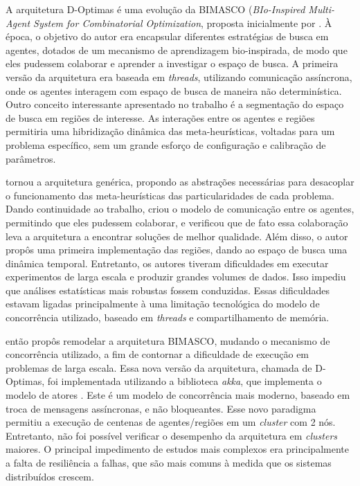 A arquitetura D-Optimas é uma evolução da BIMASCO (\textit{BIo-Inspired Multi-Agent System for Combinatorial Optimization}, proposta inicialmente por . À época, o objetivo do autor era encapsular diferentes estratégias de busca em agentes, dotados de um mecanismo de aprendizagem bio-inspirada, de modo que eles pudessem colaborar e aprender a investigar o espaço de busca. A primeira versão da arquitetura era baseada em \textit{threads}, utilizando comunicação assíncrona, onde os agentes interagem com espaço de busca de maneira não determinística. Outro conceito interessante apresentado no trabalho é a segmentação do espaço de busca em regiões de interesse. 
As interações entre os agentes e regiões permitiria uma hibridização dinâmica das meta-heurísticas, voltadas para um problema específico, sem um grande esforço de configuração e calibração de parâmetros.

 tornou a arquitetura genérica, propondo as abstrações necessárias para desacoplar o funcionamento das meta-heurísticas das particularidades de cada problema. Dando continuidade ao trabalho,  criou o modelo de comunicação entre os agentes, permitindo que eles pudessem colaborar, e verificou que de fato essa colaboração leva a arquitetura a encontrar soluções de melhor qualidade. Além disso, o autor propôs uma primeira implementação das regiões, dando ao espaço de busca uma dinâmica temporal. Entretanto, os autores tiveram dificuldades em executar experimentos de larga escala e produzir grandes volumes de dados. Isso impediu que  análises estatísticas mais robustas fossem conduzidas. Essas dificuldades estavam ligadas principalmente à uma limitação tecnológica do modelo de concorrência utilizado, baseado em \textit{threads} e compartilhamento de memória. 

 então propôs remodelar a arquitetura BIMASCO, mudando o mecanismo de concorrência utilizado, a fim de contornar a dificuldade de execução em problemas de larga escala. Essa nova versão da arquitetura, chamada de D-Optimas, foi implementada utilizando a biblioteca \textit{akka}, que implementa o modelo de atores \cite{hewitt2013}. Este é um modelo de concorrência mais moderno, baseado em troca de mensagens assíncronas, e não bloqueantes. Esse novo paradigma permitiu a execução de centenas de  agentes/regiões em um \textit{cluster} com 2 nós. Entretanto, não foi possível verificar o desempenho da arquitetura em \textit{clusters} maiores. O principal impedimento de estudos mais complexos era principalmente a falta de resiliência a falhas, que são mais comuns à medida que os sistemas distribuídos crescem.

